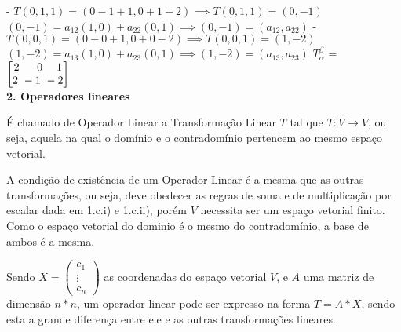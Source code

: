\documentclass[11pt,a4paper]{article}
\newcommand\tab[1][1.835cm]{\hspace*{#1}}
\begin{document}
\begin{flushleft}
\newline \tab - $T(0,1,1) = (0-1+1,0+1-2) \implies T(0,1,1) = (0,-1)$ 
\newline \tab $(0,-1) = a_{12}(1,0) + a_{22}(0,1) \implies (0,-1) = (a_{12}, a_{22})$  \linebreak
\newline \tab - $T(0,0,1) = (0-0+1,0+0-2) \implies T(0,0,1) = (1,-2)$ 
\newline \tab $(1,-2) = a_{13}(1,0) + a_{23}(0,1) \implies (1,-2) = (a_{13}, a_{23})$  \linebreak
\newline \tab $T_\alpha^\beta$ = $\begin{bmatrix} 2 \ \hspace{0.45cm} 0 \hspace{0.45cm} 1 \\ 2 \ -1 \ -2 \end{bmatrix} $
\newline \\
\pagebreak
\textbf{2. Operadores lineares}\linebreak

\tab É chamado de Operador Linear a Transformação Linear $T$ tal que $T: V \rightarrow V$, ou seja, aquela na qual o domínio e o contradomínio pertencem ao mesmo espaço vetorial.\linebreak

\tab A condição de existência de um Operador Linear é a mesma que as outras transformações, ou seja, deve obedecer as regras de soma e de multiplicação por escalar dada em 1.c.i) e 1.c.ii), porém $V$ necessita ser um espaço vetorial finito. Como o espaço vetorial do dominio é o mesmo do contradomínio, a base de ambos é a mesma.\linebreak

\tab Sendo $X = \begin{pmatrix} c_1 \\ \vdots \\ c_n \end{pmatrix}$ as coordenadas do espaço vetorial $V$, e $A$ uma matriz de dimensão $n*n$, um operador linear pode ser expresso na forma $T = A*X$, sendo esta a grande diferença entre ele e as outras transformações lineares. \linebreak


\end{flushleft}
\end{document}
